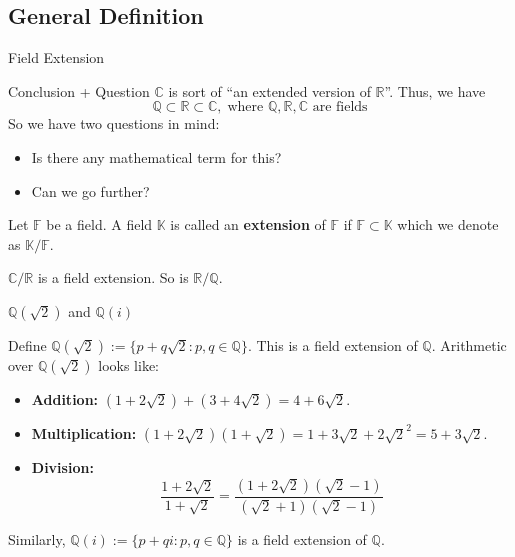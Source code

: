 \documentclass{zkdl-presentation-template}
\begin{document}
    \subsection{General Definition}
    \begin{frame}{Field Extension}
        \begin{block}{Conclusion + Question}
            $\mathbb{C}$ is sort of ``an extended version of $\mathbb{R}$''. Thus, we have
            \begin{equation*}
                \mathbb{Q} \subset \mathbb{R} \subset \mathbb{C}, \; \text{where $\mathbb{Q},\mathbb{R},\mathbb{C}$ are fields}
            \end{equation*}
            So we have two questions in mind: 
            \begin{itemize}
                \item Is there any mathematical term for this?
                \item Can we go further?
            \end{itemize}
        \end{block}

        \begin{definition}
            Let $\mathbb{F}$ be a field. A field $\mathbb{K}$ is called an \textbf{extension} of $\mathbb{F}$ if $\mathbb{F} \subset \mathbb{K}$ which we denote as $\mathbb{K}/\mathbb{F}$.
        \end{definition}

        \begin{example}
            $\mathbb{C}/\mathbb{R}$ is a field extension. So is $\mathbb{R}/\mathbb{Q}$.
        \end{example}
    \end{frame}

    \begin{frame}{$\mathbb{Q}(\sqrt{2})$ and $\mathbb{Q}(i)$}
        \begin{example}
            Define $\mathbb{Q}(\sqrt{2}) := \{p+q\sqrt{2}: p,q \in \mathbb{Q}\}$. This is a field extension of $\mathbb{Q}$. Arithmetic over $\mathbb{Q}(\sqrt{2})$ looks like:
            \begin{itemize}
                \item \textbf{Addition:} $(1+2\sqrt{2})+(3+4\sqrt{2})=4+6\sqrt{2}$.
                \item \textbf{Multiplication:} $(1+2\sqrt{2})(1+\sqrt{2}) = 1+3\sqrt{2}+2\sqrt{2}^2 = 5+3\sqrt{2}$.
                \item \textbf{Division:} 
                \begin{equation*}
                    \frac{1+2\sqrt{2}}{1+\sqrt{2}}=\frac{(1+2\sqrt{2})(\sqrt{2}-1)}{(\sqrt{2}+1)(\sqrt{2}-1)}
                \end{equation*}
            \end{itemize}
        \end{example}

        \begin{example}
            Similarly, $\mathbb{Q}(i) := \{p+qi: p,q \in \mathbb{Q}\}$ is a field extension of $\mathbb{Q}$.
        \end{example}
    \end{frame}
\end{document}
